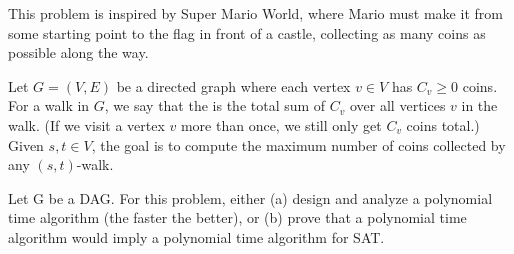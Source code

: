 \documentclass{article}
\begin{document}
\setcounter{section}{12}
\setcounter{exercise}{15}
 
This problem is inspired by Super Mario World, where Mario must make it from some starting point to the flag in front of a castle, collecting as many coins as possible along the way.

Let \( G = (V,E) \) be a directed graph where each vertex \( v \in V \) has \( C_v \geq 0 \) coins.
For a walk in \( G \), we say that the  is the total sum of \( C_v \) over all  vertices \( v \) in the walk.
(If we visit a vertex \( v \) more than once, we still only get \( C_v \) coins total.)
Given \( s, t \in V \), the goal is to compute the maximum number of coins collected by any \( (s, t) \)-walk.




\begin{subexercise} \label{mario-dag}
Let G be a DAG.
For this problem, either (a) design and analyze a polynomial time algorithm (the faster the better), or (b) prove that a polynomial time algorithm would imply a polynomial time algorithm for SAT.
\end{subexercise}
\end{document}

